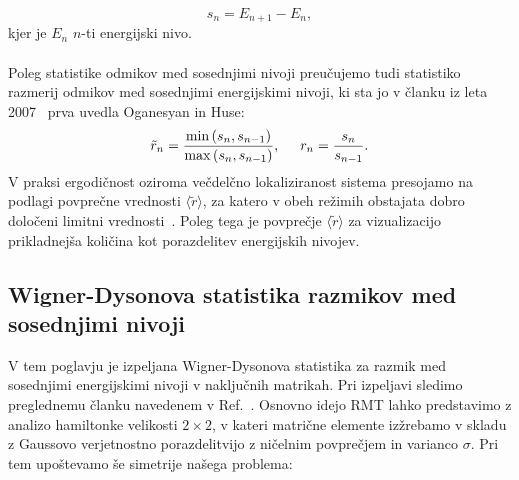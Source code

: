  \begin{equation}\label{eq:razmik}
 s_n=E_{n+1}-E_n,
 \end{equation}
 kjer je $E_n$ $n$-ti energijski nivo. \\\\
 Poleg statistike odmikov med sosednjimi nivoji 
 preučujemo tudi statistiko razmerij odmikov med sosednjimi energijskimi nivoji, ki sta jo v članku iz leta 2007~\cite{PhysRevB.75.155111} prva uvedla Oganesyan in Huse:
 \begin{equation}\label{eq:oganesyan_huse}
 \tilde{r}_n=\frac{\min\left(s_n,s_{n-1}\right)}{\max\left(s_n,s_{n-1}\right)}, \hspace{5mm} r_n=\frac{s_n}{s_{n-1}}.
 \end{equation}
 V praksi ergodičnost oziroma večdelčno lokaliziranost sistema presojamo na podlagi povprečne vrednosti $\langle \tilde{r}\rangle$, za katero v obeh režimih obstajata dobro določeni limitni vrednosti~\cite{atas2013distribution}. Poleg tega je povprečje $\langle \tilde{r}\rangle$ za vizualizacijo prikladnejša količina kot porazdelitev energijskih nivojev. 
 \subsection{Wigner-Dysonova statistika razmikov med sosednjimi nivoji} 
 V tem poglavju je izpeljana Wigner-Dysonova statistika za razmik med sosednjimi energijskimi nivoji v naključnih matrikah. Pri izpeljavi sledimo preglednemu članku navedenem v Ref.~\cite{d2016quantum}.
 Osnovno idejo RMT lahko predstavimo z analizo hamiltonke velikosti $2\times2$, v kateri matrične elemente izžrebamo v skladu z Gaussovo verjetnostno porazdelitvijo z ničelnim povprečjem in varianco $\sigma$.  Pri tem upoštevamo še simetrije našega problema:

